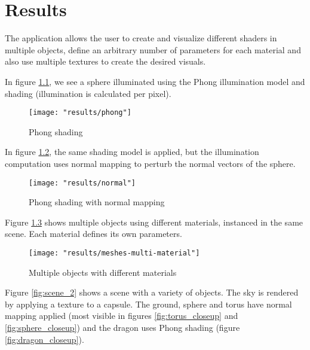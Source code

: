 \chapter{Results}
The application allows the user to create and visualize different shaders in multiple objects, define an arbitrary number of parameters for each material and also use multiple textures to create the desired visuals.

In figure \ref{fig:phong_sphere}, we see a sphere illuminated using the Phong illumination model and shading (illumination is calculated per pixel).

\begin{figure}[ht]
    \caption{Phong shading}
    \begin{center}
        \texttt{[image: "results/phong"]}
    \end{center}
    \label{fig:phong_sphere}
\end{figure}

In figure \ref{fig:phong_normal_sphere}, the same shading model is applied, but the illumination computation uses normal mapping to perturb the normal vectors of the sphere.

\begin{figure}[ht]
    \caption{Phong shading with normal mapping}
    \begin{center}
        \texttt{[image: "results/normal"]}
    \end{center}
    \label{fig:phong_normal_sphere}
\end{figure}

Figure \ref{fig:scene_1} shows multiple objects using different materials, instanced in the same scene. Each material defines its own parameters.

\begin{figure}[ht]
    \caption{Multiple objects with different materials}
    \begin{center}
        \texttt{[image: "results/meshes-multi-material"]}
    \end{center}
    \label{fig:scene_1}
\end{figure}

Figure \ref{fig:scene_2} shows a scene with a variety of objects. The sky is rendered by applying a texture to a capsule. The ground, sphere and torus have normal mapping applied (most visible in figures \ref{fig:torus_closeup} and \ref{fig:sphere_closeup}) and the dragon uses Phong shading (figure \ref{fig:dragon_closeup}).

